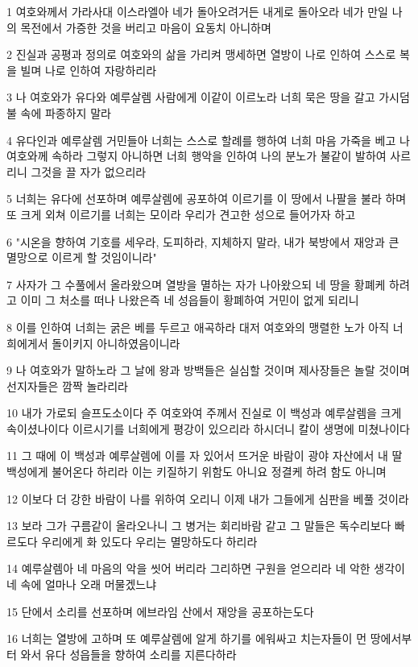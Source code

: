 \par 1 여호와께서 가라사대 이스라엘아 네가 돌아오려거든 내게로 돌아오라 네가 만일 나의 목전에서 가증한 것을 버리고 마음이 요동치 아니하며
\par 2 진실과 공평과 정의로 여호와의 삶을 가리켜 맹세하면 열방이 나로 인하여 스스로 복을 빌며 나로 인하여 자랑하리라
\par 3 나 여호와가 유다와 예루살렘 사람에게 이같이 이르노라 너희 묵은 땅을 갈고 가시덤불 속에 파종하지 말라
\par 4 유다인과 예루살렘 거민들아 너희는 스스로 할례를 행하여 너희 마음 가죽을 베고 나 여호와께 속하라 그렇지 아니하면 너희 행악을 인하여 나의 분노가 불같이 발하여 사르리니 그것을 끌 자가 없으리라
\par 5 너희는 유다에 선포하며 예루살렘에 공포하여 이르기를 이 땅에서 나팔을 불라 하며 또 크게 외쳐 이르기를 너희는 모이라 우리가 견고한 성으로 들어가자 하고
\par 6 "시온을 향하여 기호를 세우라, 도피하라, 지체하지 말라, 내가 북방에서 재앙과 큰 멸망으로 이르게 할 것임이니라"
\par 7 사자가 그 수풀에서 올라왔으며 열방을 멸하는 자가 나아왔으되 네 땅을 황폐케 하려고 이미 그 처소를 떠나 나왔은즉 네 성읍들이 황폐하여 거민이 없게 되리니
\par 8 이를 인하여 너희는 굵은 베를 두르고 애곡하라 대저 여호와의 맹렬한 노가 아직 너희에게서 돌이키지 아니하였음이니라
\par 9 나 여호와가 말하노라 그 날에 왕과 방백들은 실심할 것이며 제사장들은 놀랄 것이며 선지자들은 깜짝 놀라리라
\par 10 내가 가로되 슬프도소이다 주 여호와여 주께서 진실로 이 백성과 예루살렘을 크게 속이셨나이다 이르시기를 너희에게 평강이 있으리라 하시더니 칼이 생명에 미쳤나이다
\par 11 그 때에 이 백성과 예루살렘에 이를 자 있어서 뜨거운 바람이 광야 자산에서 내 딸 백성에게 불어온다 하리라 이는 키질하기 위함도 아니요 정결케 하려 함도 아니며
\par 12 이보다 더 강한 바람이 나를 위하여 오리니 이제 내가 그들에게 심판을 베풀 것이라
\par 13 보라 그가 구름같이 올라오나니 그 병거는 회리바람 같고 그 말들은 독수리보다 빠르도다 우리에게 화 있도다 우리는 멸망하도다 하리라
\par 14 예루살렘아 네 마음의 악을 씻어 버리라 그리하면 구원을 얻으리라 네 악한 생각이 네 속에 얼마나 오래 머물겠느냐
\par 15 단에서 소리를 선포하며 에브라임 산에서 재앙을 공포하는도다
\par 16 너희는 열방에 고하며 또 예루살렘에 알게 하기를 에워싸고 치는자들이 먼 땅에서부터 와서 유다 성읍들을 향하여 소리를 지른다하라
